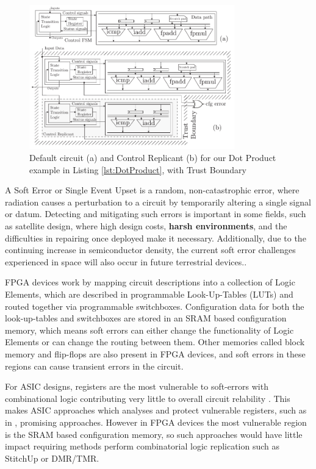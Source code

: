 \begin{figure}[t]
\centering
\includegraphics[width=3.5in]{./imgs/StitchUpReplication.pdf}
\caption{Default circuit (a) and Control Replicant (b) for our Dot Product example in Listing \ref{lst:DotProduct}, with Trust Boundary \vspace{-5mm}}
\label{fig:HLSArch}
\end{figure}

A Soft Error or Single Event Upset is a random, non-catastrophic error, where radiation causes
a perturbation to a circuit by temporarily altering a single signal or datum.
Detecting and mitigating such errors is important in some fields, such as satellite design,
where high design costs, \textbf{harsh environments}, and the difficulties in repairing once deployed make it necessary.
Additionally, due to the continuing increase in semiconductor density, the current soft error challenges 
experienced in space will also occur in future terrestrial devices.\cite{normand1996single}\cite{henkel2013reliable}.

FPGA devices work by mapping circuit descriptions into a collection of Logic Elements,
which are described in programmable Look-Up-Tables (LUTs) and routed together via
programmable switchboxes.
Configuration data for both the look-up-tables and switchboxes are stored in an SRAM based
configuration memory, which means soft errors can either change the functionality
of Logic Elements or can change the routing between them.
Other memories called block memory and flip-flops are also present in FPGA devices,
and soft errors in these regions can cause transient errors in the circuit.

For ASIC designs, registers are the most vulnerable to soft-errors with
combinational logic contributing very little to overall circuit relability \cite{baumann2005soft}.
This makes ASIC approaches which analyses and protect vulnerable registers, such as in \cite{chen2014reliability},
promising approaches.
However in FPGA devices the most vulnerable region is the SRAM based configuration memory,
so such approaches would have little impact requiring methods perform combinatorial logic
replication such as StitchUp or DMR/TMR.

